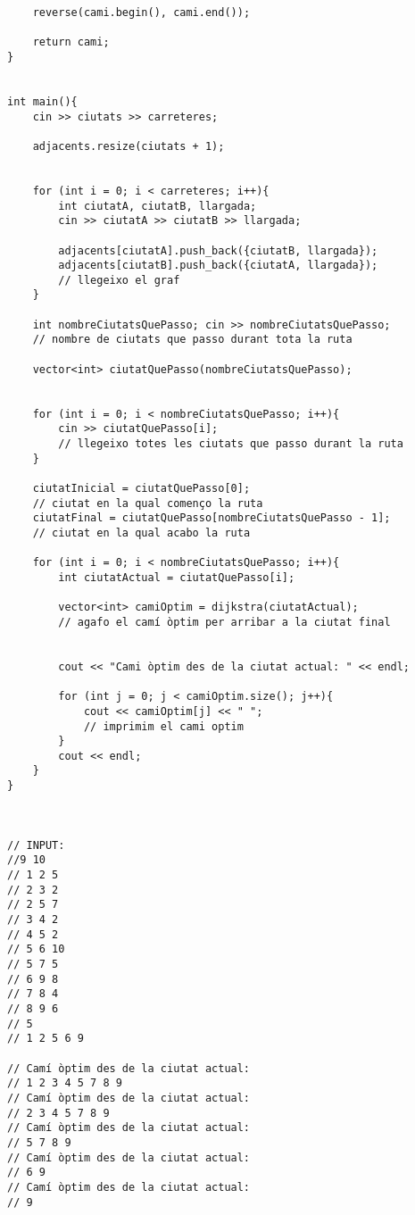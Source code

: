 \begin{lstlisting}
    reverse(cami.begin(), cami.end());

    return cami;
}


int main(){
    cin >> ciutats >> carreteres;
    
    adjacents.resize(ciutats + 1);
    

    for (int i = 0; i < carreteres; i++){
        int ciutatA, ciutatB, llargada; 
        cin >> ciutatA >> ciutatB >> llargada;

        adjacents[ciutatA].push_back({ciutatB, llargada});
        adjacents[ciutatB].push_back({ciutatA, llargada});
        // llegeixo el graf
    }

    int nombreCiutatsQuePasso; cin >> nombreCiutatsQuePasso;
    // nombre de ciutats que passo durant tota la ruta

    vector<int> ciutatQuePasso(nombreCiutatsQuePasso);


    for (int i = 0; i < nombreCiutatsQuePasso; i++){
        cin >> ciutatQuePasso[i];
        // llegeixo totes les ciutats que passo durant la ruta
    }

    ciutatInicial = ciutatQuePasso[0];
    // ciutat en la qual començo la ruta
    ciutatFinal = ciutatQuePasso[nombreCiutatsQuePasso - 1];
    // ciutat en la qual acabo la ruta

    for (int i = 0; i < nombreCiutatsQuePasso; i++){
        int ciutatActual = ciutatQuePasso[i];

        vector<int> camiOptim = dijkstra(ciutatActual);
        // agafo el camí òptim per arribar a la ciutat final


        cout << "Cami òptim des de la ciutat actual: " << endl;

        for (int j = 0; j < camiOptim.size(); j++){
            cout << camiOptim[j] << " ";
            // imprimim el cami optim 
        }
        cout << endl;
    }
}



// INPUT:
//9 10
// 1 2 5
// 2 3 2
// 2 5 7
// 3 4 2
// 4 5 2
// 5 6 10
// 5 7 5
// 6 9 8
// 7 8 4
// 8 9 6
// 5
// 1 2 5 6 9

// Camí òptim des de la ciutat actual: 
// 1 2 3 4 5 7 8 9 
// Camí òptim des de la ciutat actual: 
// 2 3 4 5 7 8 9 
// Camí òptim des de la ciutat actual: 
// 5 7 8 9 
// Camí òptim des de la ciutat actual: 
// 6 9 
// Camí òptim des de la ciutat actual: 
// 9
\end{lstlisting}
